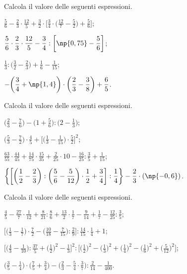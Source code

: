 \begin{esercizio}[\Ast]
 Calcola il valore delle seguenti espressioni.
\begin{enumeratea}
\spazielenx
\item $\displaystyle{\frac{5}{6}-\frac{2}{3}\cdot\frac{12}{5}+\frac{3}{2}\cdot\bigg[\frac{3}{4}\cdot%
\bigg(\frac{12}{7}-\frac{5}{2}\bigg)+\frac{5}{6}\bigg]}$;
\item $\displaystyle{\frac{5}{6}\cdot{\frac{2}{3}}\cdot\frac{12}{5}-\frac{3}{4}:\bigg[%
\np{0,75}-\frac{5}{6}\bigg]}$;
\item $\displaystyle{\frac{1}{3}:\bigg(\frac{3}{2}-\frac{2}{3}\bigg)+\frac{1}{6}-\frac{1}{15}}$;
\item $\displaystyle{-\bigg(\frac{3}{4}+\np{1,4}\bigg)\cdot\bigg(\frac{2}{3}-\frac{3}{8}\bigg)+\frac{6}{5}}$.
\end{enumeratea}
\end{esercizio}

\begin{esercizio}[\Ast]
 Calcola il valore delle seguenti espressioni.
\begin{enumeratea}
\spazielenx
\item $\displaystyle{\bigg(\frac{2}{3}-\frac{7}{6}\bigg)-\bigg(1+\frac{5}{6}\bigg):\bigg(2-\frac{1}{3}\bigg)}$;
\item $\displaystyle{\bigg(\frac{5}{3}-\frac{7}{2}\bigg)\cdot\frac{4}{5}+\bigg[\bigg(\frac{1}{3}-\frac{1}{15}\bigg)%
\cdot\frac{5}{2}\bigg]^{2}}$;
\item $\displaystyle{\frac{63}{55}\cdot\frac{44}{45}+\frac{14}{75}\cdot\frac{15}{35}+\frac{2}{25}\cdot%
10-\frac{16}{25}:\frac{3}{5}+\frac{1}{15}}$;
\item $\displaystyle{\bigg\{\bigg[\bigg(\frac{1}{2}-\frac{2}{3}\bigg):\bigg(\frac{5}{6}-\frac{5}{12}\bigg)\cdot%
\frac{1}{2}+\frac{3}{4}\bigg]:\frac{1}{4}\bigg\}-\frac{2}{3}\cdot(\np{-0,6})}$.
\end{enumeratea}
\end{esercizio}

\begin{esercizio}[\Ast]
Calcola il valore delle seguenti espressioni.
\begin{enumeratea}
\spazielenx
\item $\displaystyle{\frac{4}{5}-\frac{27}{7}\cdot{\frac{1}{12}}+\frac{8}{21}:\frac{8}{6}+\frac{13}{2}\cdot
\frac{1}{7}-\frac{9}{14}+\frac{1}{7}-\frac{12}{25}:\frac{3}{5}}$;
\item $\displaystyle{\bigg[\bigg(\frac{1}{3}-\frac{1}{7}\bigg)\cdot
{\frac{7}{2}}-\bigg(\frac{10}{18}-\frac{7}{15}\bigg):\frac{2}{9}\bigg]:\frac{14}{15}\cdot
{\frac{1}{4}}+1}$;
\item $\displaystyle{\bigg[\bigg(\frac{4}{3}-\frac{1}{10}\bigg):\frac{37}{5}+\bigg(\frac{1}{2}\bigg)^{2}-\frac{1}{3}%
\bigg]^{2}:\bigg[\bigg(\frac{1}{2}\bigg)^{2}-\bigg(\frac{1}{3}\bigg)^{2}+\bigg(\frac{1}{4}\bigg)^{2}-%
\bigg(\frac{1}{6}\bigg)^{2}+\bigg(\frac{5}{12}\bigg)^{2}\bigg]}$;
\item $\displaystyle{\bigg(\frac{3}{5}-\frac{1}{4}\bigg)\cdot\bigg(\frac{7}{5}+\frac{3}{4}\bigg)-\bigg(\frac{2}{3}-%
\frac{5}{4}\cdot\frac{3}{7}\bigg):\frac{2}{14}-\frac{1}{400}}$.
\end{enumeratea}
\end{esercizio}

